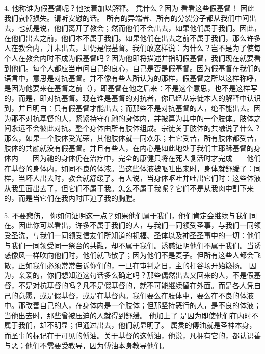 4. 他称谁为假基督呢？他接着加以解释。 凭什么？因为 看看这些假基督！ 因此我们哀悼损失。请听安慰的话。 所有的异端者、所有的分裂分子都从我们中间出去，也就是说，他们离开了教会；然而他们不会出去，如果他们属于我们。因此，在他们出去之前，他们本不属于我们。如果他们在出去之前不属于我们，那么许多人在教会内，并未出去，却仍是假基督。我们敢这样说：为什么？岂不是为了使每个人在教会内时不成为假基督吗？因为他即将描述并指明假基督，我们现在就要看到他们。每个人都应当审问自己的良心，自己是否是假基督。因为假基督在我们的语言中，意思是对抗基督。并不像有些人所认为的那样，假基督之所以这样称呼，是因为他要来在基督之前（），即基督在他之后来：不是这个意思，也不是这样写的，而是，即对抗基督。现在谁是基督的对抗者，你已经从宗徒本人的解释中认识到，并且明白：只有假基督才能出去；而那些不是对抗基督的人，绝不能出去。因为那不对抗基督的人，紧紧持守在祂的身体内，并被算为其中的一个肢体。肢体之间永远不会彼此对抗。整个身体由所有肢体组成。宗徒关于肢体的共融说了什么？  那么，如果一个肢体受光荣，其他肢体就一同欢乐；若它受苦，所有肢体都受苦，肢体的共融就没有假基督。并且有些人，在内心是如此地处于我们主耶稣基督的身体内——因为祂的身体仍在治疗中，完全的康健只将在死人复活时才完成——他们在基督的身体内，如同不良的体液。当这些体液被呕吐出来时，身体就舒缓了：同样，当坏人出去时，教会就舒缓了。有人说，当身体呕吐并吐出它们时：这些体液从我里面出去了，但它们不属于我。怎么不属于我呢？它们不是从我肉中割下来的，而是当它们在我内时压迫了我的胸膛。\par

5.  不要悲伤， 你如何证明这一点？如果他们属于我们，他们肯定会继续与我们同在。因此你可以看出，许多不属于我们的人，与我们一同领受圣事，与我们一同领受圣洗，与我们一同领受信友们所知道的祝福、圣体以及神圣圣事中的一切：他们与我们一同领受同一祭台的共融，却不属于我们。诱惑证明他们不属于我们。当诱惑像风一样吹向他们时，他们就飞散了；因为他们不是麦子。但所有这些人都会飞散，正如我们必须常常告诉你们的，一旦在审判之日，主的打谷场开始簸扬。 因为，亲爱的，你们想知道这句话多么确定吗？那些偶然出去又回来的人，不是假基督，不是对抗基督的吗？凡不是假基督的，就不可能继续留在外面。而是各人凭自己的意愿，或是假基督，或是在基督内。我们要么在肢体中，要么在不良的体液中。那改善自己的人，在身体内是一个肢体；但那坚持恶行的人，是不良的体液；当他出去时，那些曾被压迫的人就得到舒缓。 他加上了 是因为即使他们在内时不属于我们，却不明显；但通过出去，他们就显明了。 属灵的傅油就是圣神本身，而圣事的标记在于可见的傅油。关于基督的这傅油，他说，凡拥有它的，都认识善与恶；他们不需要受教导，因为傅油本身教导他们。\par

